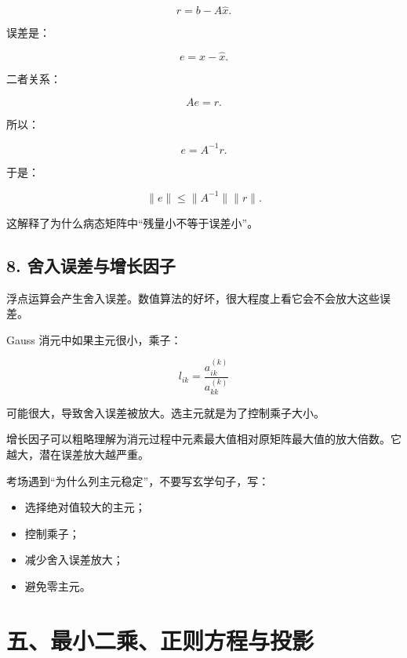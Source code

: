 \documentclass[11pt,a4paper]{ctexart}
\begin{document}
\[
r=b-A\hat x.
\]

误差是：

\[
e=x-\hat x.
\]

二者关系：

\[
Ae=r.
\]

所以：

\[
e=A^{-1}r.
\]

于是：

\[
\|e\|\le \|A^{-1}\|\|r\|.
\]

这解释了为什么病态矩阵中“残量小不等于误差小”。


\subsection*{8. 舍入误差与增长因子}


浮点运算会产生舍入误差。数值算法的好坏，很大程度上看它会不会放大这些误差。

Gauss 消元中如果主元很小，乘子：

\[
l_{ik}=\frac{a_{ik}^{(k)}}{a_{kk}^{(k)}}
\]

可能很大，导致舍入误差被放大。选主元就是为了控制乘子大小。

增长因子可以粗略理解为消元过程中元素最大值相对原矩阵最大值的放大倍数。它越大，潜在误差放大越严重。

考场遇到“为什么列主元稳定”，不要写玄学句子，写：

\begin{itemize}

\item 选择绝对值较大的主元；

\item 控制乘子；

\item 减少舍入误差放大；

\item 避免零主元。

\end{itemize}


\section*{五、最小二乘、正则方程与投影}


\end{document}
